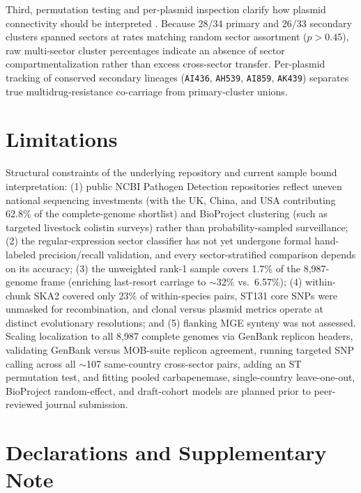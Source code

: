 \documentclass[11pt,a4paper]{article}
\begin{document}
Third, permutation testing and per-plasmid inspection clarify how plasmid connectivity should be interpreted \cite{ludden2019,redondosalvo2020,acman2022}. Because 28/34 primary and 26/33 secondary clusters spanned sectors at rates matching random sector assortment ($p > 0.45$), raw multi-sector cluster percentages indicate an absence of sector compartmentalization rather than excess cross-sector transfer. Per-plasmid tracking of conserved secondary lineages (\texttt{AI436}, \texttt{AH539}, \texttt{AI859}, \texttt{AK439}) separates true multidrug-resistance co-carriage from primary-cluster unions.

\section{Limitations}

Structural constraints of the underlying repository and current sample bound interpretation: (1) public NCBI Pathogen Detection repositories reflect uneven national sequencing investments (with the UK, China, and USA contributing 62.8\% of the complete-genome shortlist) and BioProject clustering (such as targeted livestock colistin surveys) rather than probability-sampled surveillance; (2) the regular-expression sector classifier has not yet undergone formal hand-labeled precision/recall validation, and every sector-stratified comparison depends on its accuracy; (3) the unweighted rank-1 sample covers 1.7\% of the 8,987-genome frame (enriching last-resort carriage to $\sim$32\% vs.\ 6.57\%); (4) within-chunk SKA2 covered only 23\% of within-species pairs, ST131 core SNPs were unmasked for recombination, and clonal versus plasmid metrics operate at distinct evolutionary resolutions; and (5) flanking MGE synteny was not assessed. Scaling localization to all 8,987 complete genomes via GenBank replicon headers, validating GenBank versus MOB-suite replicon agreement, running targeted SNP calling across all $\sim$107 same-country cross-sector pairs, adding an ST permutation test, and fitting pooled carbapenemase, single-country leave-one-out, BioProject random-effect, and draft-cohort models are planned prior to peer-reviewed journal submission.

\section{Declarations and Supplementary Note}
\end{document}
